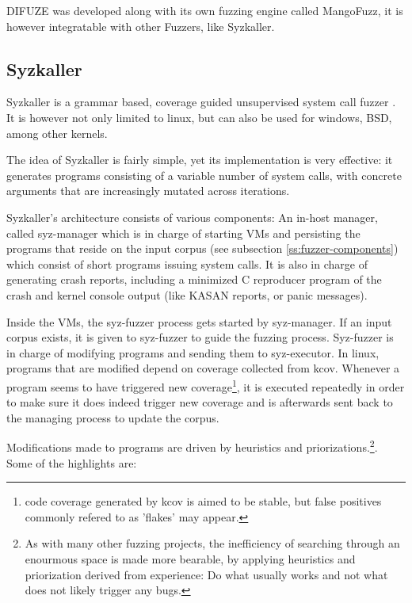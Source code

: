 DIFUZE was developed along with its own fuzzing engine called MangoFuzz, it is however integratable with other Fuzzers, like Syzkaller.



\subsection{Syzkaller}

Syzkaller is a grammar based, coverage guided unsupervised
system call fuzzer \cite{GoogleSyzkaller2021}. It is however not only
limited to linux, but can also be used for windows, BSD, among other
kernels.

The idea of Syzkaller is fairly simple, yet its implementation is very effective: it generates
programs consisting of a variable number of system calls, with
concrete arguments that are increasingly mutated across iterations.


Syzkaller's architecture consists of various components: An in-host manager, called
syz-manager which is in charge of starting VMs and persisting the programs that
reside on the input corpus (see subsection \ref{ss:fuzzer-components}) which consist of short programs issuing
system calls. It is also in charge of generating crash reports, including a minimized C reproducer program of the crash and kernel console output (like KASAN reports, or panic
messages).

Inside the VMs, the syz-fuzzer process gets started by syz-manager. If an input
corpus exists, it is given to syz-fuzzer to guide the fuzzing process. Syz-fuzzer is
in charge of modifying programs and sending them to syz-executor. In linux, programs that
are modified depend on coverage collected from kcov. Whenever a program seems to have triggered new coverage\footnote{code coverage generated by kcov is aimed to be stable, but false positives commonly refered to as 'flakes' may appear.},
it is executed repeatedly in order to make sure it does indeed trigger new coverage and is
afterwards sent back to the managing process to update the corpus.

Modifications made to programs are driven by heuristics and priorizations.\footnote{As with many other fuzzing projects, the inefficiency of searching through an enourmous space is made more bearable, by applying heuristics and priorization derived from experience: Do what usually works and not what does not likely trigger any bugs.}. Some of the highlights are\cite{vyukovSyzkallerAdventuresContinuous2020}:

